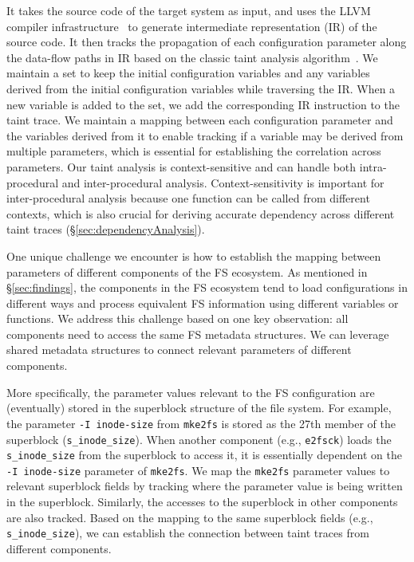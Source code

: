  It takes the source code of the target system as input, 
and uses the LLVM compiler infrastructure~\cite{LLVM} 
to generate intermediate representation (IR) of the source code.
It then tracks the propagation of each configuration parameter  along the data-flow paths in IR based on the classic taint analysis algorithm~\cite{DrChecker}. 
We maintain  a set to keep the initial configuration variables and any variables  derived from the initial configuration variables while traversing the IR. When a new variable is added to the set, we add the corresponding IR instruction to the taint trace. 
We maintain a mapping between each configuration parameter and  the variables derived from it to enable tracking if a variable may be derived from multiple parameters, which is essential for establishing the correlation across parameters.
Our taint analysis is context-sensitive and can handle both intra-procedural and inter-procedural analysis. Context-sensitivity is important  for inter-procedural analysis because one function can be called from different contexts, which is also crucial for deriving accurate dependency across different taint traces (\S\ref{sec:dependencyAnalysis}).
 

One unique challenge we encounter is how to establish the mapping between  parameters of different components of the FS ecosystem.
As mentioned in \S\ref{sec:findings},
the components in the FS ecosystem tend to load configurations in different ways and process equivalent FS information using different variables or functions. We address this challenge based on one key observation: all  components need to access the same FS metadata structures. We can leverage  shared metadata structures   to connect relevant  parameters of different components. 

More specifically, the parameter values relevant to the FS configuration are (eventually) stored in the superblock structure of the file system. 
For example, the parameter \texttt{-I inode-size} from \texttt{mke2fs} is stored as the {27th} member of   the superblock (\texttt{s\_inode\_size}). When another component (e.g., \texttt{e2fsck}) loads the  \texttt{s\_inode\_size}   from the superblock to access it, it is essentially dependent on the \texttt{-I inode-size} parameter of  \texttt{mke2fs}.
We map the \texttt{mke2fs} parameter values to  relevant superblock fields by tracking where the parameter value is being written in the superblock. Similarly, the accesses to the superblock in other components are also tracked. Based on the mapping to the same superblock fields (e.g., \texttt{s\_inode\_size}), we can establish the connection between  taint traces from different components. 

